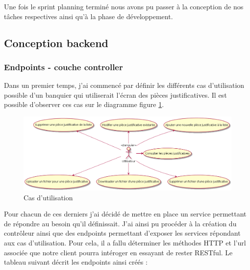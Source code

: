 	Une fois le sprint planning terminé nous avons pu passer à la conception de nos tâches respectives ainsi qu'à la phase de développement.

\subsection{Conception backend}

	\subsubsection{Endpoints - couche controller}

	Dans un premier temps, j'ai commencé par définir les différents cas d'utilisation possible d'un banquier qui utiliserait l'écran des pièces justificatives. Il est possible d'observer ces cas sur le diagramme figure \ref{useCasePJ}.

\begin{figure}[h!]
	\includegraphics[scale=0.50]{images/travailBP1818/piecesJustif/useCasePJ.png}
	\centering
	\caption{Cas d'utilisation}
	\label{useCasePJ}
\end{figure}

	Pour chacun de ces derniers j'ai décidé de mettre en place un service permettant de répondre au besoin qu'il définissait. J'ai ainsi pu procéder à la création du contrôleur ainsi que des endpoints permettant d'exposer les services répondant aux cas d'utilisation. Pour cela, il a fallu déterminer les méthodes HTTP et l'url associée que notre client pourra intéroger en essayant de rester RESTful. Le tableau suivant décrit les endpoints ainsi créés :
	
